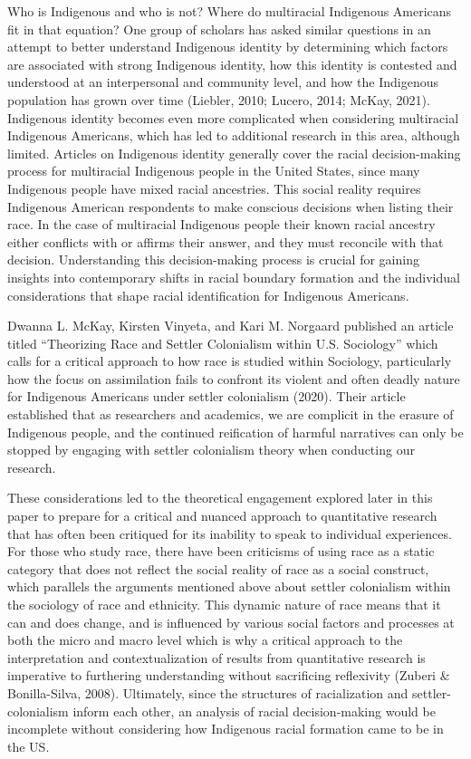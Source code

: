 \documentclass[
  12pt,
  letterpaper,
]{article}
\begin{document}
Who is Indigenous and who is not? Where do multiracial Indigenous
Americans fit in that equation? One group of scholars has asked similar
questions in an attempt to better understand Indigenous identity by
determining which factors are associated with strong Indigenous
identity, how this identity is contested and understood at an
interpersonal and community level, and how the Indigenous population has
grown over time (Liebler, 2010; Lucero, 2014; McKay, 2021). Indigenous
identity becomes even more complicated when considering multiracial
Indigenous Americans, which has led to additional research in this area,
although limited. Articles on Indigenous identity generally cover the
racial decision-making process for multiracial Indigenous people in the
United States, since many Indigenous people have mixed racial
ancestries. This social reality requires Indigenous American respondents
to make conscious decisions when listing their race. In the case of
multiracial Indigenous people their known racial ancestry either
conflicts with or affirms their answer, and they must reconcile with
that decision. Understanding this decision-making process is crucial for
gaining insights into contemporary shifts in racial boundary formation
and the individual considerations that shape racial identification for
Indigenous Americans.

Dwanna L. McKay, Kirsten Vinyeta, and Kari M. Norgaard published an
article titled ``Theorizing Race and Settler Colonialism within U.S.
Sociology'' which calls for a critical approach to how race is studied
within Sociology, particularly how the focus on assimilation fails to
confront its violent and often deadly nature for Indigenous Americans
under settler colonialism (2020). Their article established that as
researchers and academics, we are complicit in the erasure of Indigenous
people, and the continued reification of harmful narratives can only be
stopped by engaging with settler colonialism theory when conducting our
research.

These considerations led to the theoretical engagement explored later in
this paper to prepare for a critical and nuanced approach to
quantitative research that has often been critiqued for its inability to
speak to individual experiences. For those who study race, there have
been criticisms of using race as a static category that does not reflect
the social reality of race as a social construct, which parallels the
arguments mentioned above about settler colonialism within the sociology
of race and ethnicity. This dynamic nature of race means that it can and
does change, and is influenced by various social factors and processes
at both the micro and macro level which is why a critical approach to
the interpretation and contextualization of results from quantitative
research is imperative to furthering understanding without sacrificing
reflexivity (Zuberi \& Bonilla-Silva, 2008). Ultimately, since the
structures of racialization and settler-colonialism inform each other,
an analysis of racial decision-making would be incomplete without
considering how Indigenous racial formation came to be in the US.
\end{document}
